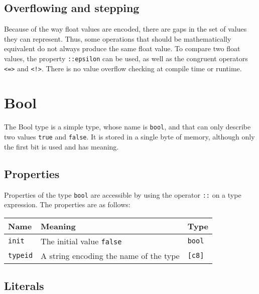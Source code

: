 \subsection{Overflowing and stepping}
\label{sec:orgd5d9f51}

Because of the way float values are encoded, there are gaps in the set of values
they can represent. Thus, some operations that should be mathematically
equivalent do not always produce the same float value. To compare two float
values, the property \texttt{::epsilon} can be used, as well as the congruent
operators \texttt{<=>} and \texttt{<!>}. There is no value overflow checking
at compile time or runtime.

\section{Bool}
\label{sec:org9f3a743}

The Bool type is a simple type, whose name is \texttt{bool}, and that can only
describe two values \texttt{true} and \texttt{false}. It is stored in a single
byte of memory, although only the first bit is used and has meaning.

\subsection{Properties}
\label{sec:org503bc9e}

Properties of the type \texttt{bool} are accessible by using the operator
\texttt{::} on a type expression. The properties are as follows:

\begin{center}
  \vspace{-5pt}
  \begin{adjustbox}{max width=\linewidth}
    \begin{tabular}{|l|ll|}
      \hline
      Name & Meaning & Type\\[0pt]
      \hline
      \hline
      \texttt{init} & The initial value \texttt{false} & \texttt{bool}\\[0pt]
      \hline
      \texttt{typeid} & A string encoding the name of the type & \texttt{[c8]}\\[0pt]
      \hline
    \end{tabular}
  \end{adjustbox}
\end{center}

\subsection{Literals}
\label{sec:org7620b9c}

